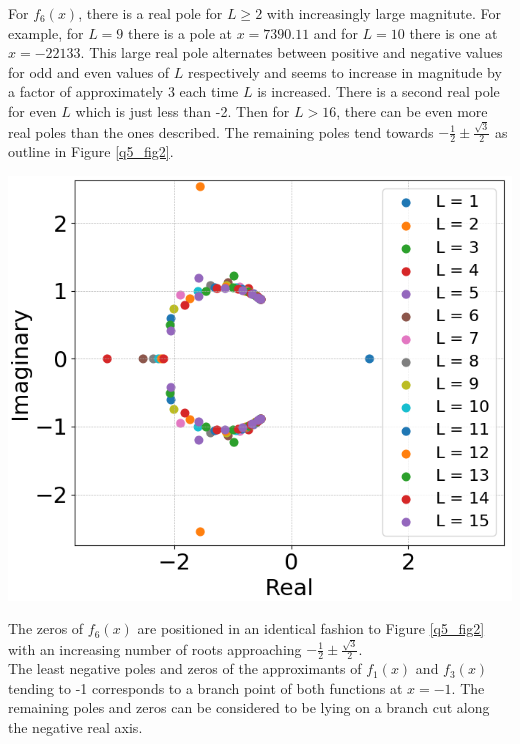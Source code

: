 \documentclass[12pt, a4paper]{article}
\begin{document}
For $f_{6}(x)$, there is a real pole for $L\geq 2 $ with increasingly large magnitute. For example, for 
$L = 9$ there is a pole at $x=7390.11$ and for $L=10$ there is one at $x=-22133$. This large real pole 
alternates between positive and negative values for odd and even values of $L$ respectively and seems
to increase in magnitude by a factor of approximately 3 each time $L$ is increased. There is a second
real pole for even $L$ which is just less than -2. Then for $L > 16$, there can be even more real poles 
than the ones described. The remaining poles tend towards 
$-\frac{1}{2} \pm \frac{\sqrt{3}}{2}$ as outline in Figure \ref{q5_fig2}.
\\

\vspace{0.1cm}
\begin{minipage}{\textwidth}
	\centering
	\includegraphics[width=0.6\linewidth]{q5_fig2}
	\label{q5_fig2}
\end{minipage}
\vspace{0.1cm}

The zeros of $f_{6}(x)$ are positioned in an identical fashion to Figure \ref{q5_fig2} with an increasing 
number of roots approaching $-\frac{1}{2} \pm \frac{\sqrt{3}}{2}$. 
\\

The least negative poles and zeros of the approximants of $f_{1}(x)$ and $f_{3}(x)$ tending to -1 corresponds
to a branch point of both functions at $x=-1$. The remaining poles and zeros can be 
considered to be lying on a branch cut along the negative real axis.
\\
\end{document}
